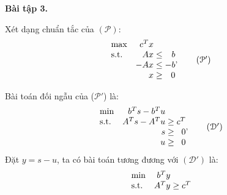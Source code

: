 \textbf{Bài tập 3.}
\begin{solution}

Xét dạng chuẩn tắc của  $(\mathcal{P})$:
\begin{equation*}
    \begin{array}{lr@{}c@{}r@{}l}
        \text{max} &c^{T}x\\
        \text{s.t.} & Ax{} & {}\leq{} & b\\
        & -Ax{} & {}\leq{} & -b\\
        & x{} & {}\geq{} & {}0
    \end{array},
\tag{$\mathcal{P}'$}
\end{equation*}
    

Bài toán đối ngẫu của  ($\mathcal{P}'$) là:
\begin{equation*}
    \begin{array}{lr@{}c@{}r@{}l}
        \text{min} &b^{T}s - b^{T}u\\
        \text{s.t.} & A^{T}s{} -A^{T}u{}& {}\geq{} & c^{T}\\
        & s{} & {}\geq{} & {}0\\
        & u{} & {}\geq{} & {}0
    \end{array},
    \tag {$\mathcal{D}'$}
\end{equation*}
Đặt $y=s-u$, ta có bài toán tương đương với {$(\mathcal{D}')$} là:
\begin{equation*}
    \begin{array}
        {lr@{}c@{}r@{}l}
        \text{min} &b^{T}y\\
        \text{s.t.} & A^{T}y{} & {}\geq{} & c^{T}\\
    \end{array}
\end{equation*}
\end{solution}
